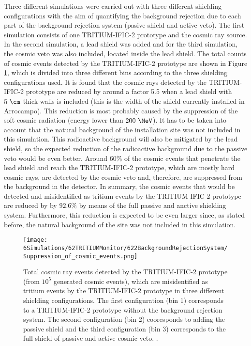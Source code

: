 Three different simulations were carried out with three different shielding configurations with the aim of quantifying the background rejection due to each part of the background rejection system (pasive shield and active veto). The first simulation consists of one TRITIUM-IFIC-2 prototype and the cosmic ray source. In the second simulation, a lead shield was added and for the third simulation, the cosmic veto was also included, located inside the lead shield. The total counts of cosmic events detected by the TRITIUM-IFIC-2 prototype are shown in Figure \ref{fig:CosmicEventsSuppressionSimulated}, which is divided into three different bins according to the three shielding configurations used. It is found that the cosmic rays detected by the TRITIUM-IFIC-2 prototype are reduced by around a factor 5.5 when a lead shield with $5~\cm$ thick walls is included (this is the width of the shield currently installed in Arrocampo). This reduction is most probably caused by the suppression of the soft cosmic radiation (energy lower than $200~\MeV$). It has to be taken into account that the natural background of the installation site was not included in this simulation. This radioactive background will also be mitigated by the lead shield, so the expected reduction of the radioactive background due to the passive veto would be even better. Around $60\%$ of the cosmic events that penetrate the lead shield and reach the TRITIUM-IFIC-2 prototype, which are mostly hard cosmic rays, are detected by the cosmic veto and, therefore, are suppressed from the background in the detector. In summary, the cosmic events that would be detected and misidentified as tritium events by the TRITIUM-IFIC-2 prototype are reduced by by $92.6\%$ by means of the full passive and anctive shielding system. Furthermore, this reduction is expected to be even larger since, as stated before, the natural background of the site was not included in this simulation.

\begin{figure}[h]
\texttt{[image: 6Simulations/62TRITIUMMonitor/622BackgroundRejectionSystem/Suppression\_of\_cosmic\_events.png]}
\centering
\caption{Total cosmic ray events detected by the TRITIUM-IFIC-2 prototype (from $10^5$ generated cosmic events), which are misidentified as tritium events by the TRITIUM-IFIC-2 prototype in three different shielding configurations. The first configuration (bin 1) corresponds to a TRITIUM-IFIC-2 prototype without the background rejection system. The second configuration (bin 2) cooresponds to adding the passive shield and the third configuration (bin 3) corresponds to the full shield of passive and active cosmic veto.  \label{fig:CosmicEventsSuppressionSimulated}.}
\end{figure}